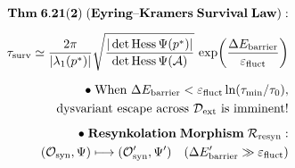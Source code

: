 \documentclass[preview]{standalone}
\begin{document}
\begin{align*}
\special{dvisvgm:raw <g id='unique000'>}\mathbf{Thm\;6.21(2)\;(Eyring\text{--}Kramers\;Survival\;Law):}\\[5pt]\tau_{\text{surv}} \simeq \frac{2\pi}{|\lambda_1(p^*)|}\sqrt{\frac{|\det\operatorname{Hess}\Psi(p^*)|}{\det\operatorname{Hess}\Psi(\mathcal{A})}}\,\exp\!\left(\frac{\Delta E_{\text{barrier}}}{\varepsilon_{\text{fluct}}}\right)\\[6pt]\bullet\;\text{When }\Delta E_{\text{barrier}} < \varepsilon_{\text{fluct}}\ln(\tau_{\min}/\tau_0),\\\;\;\text{dysvariant escape across }\mathcal{D}_{\text{ext}}\text{ is imminent!}\\[5pt]\bullet\;\mathbf{Resynkolation\;Morphism\;\mathcal{R}_{\text{resyn}}:}\\\;\;(\mathcal{O}_{\text{syn}}, \Psi) \longmapsto (\mathcal{O}'_{\text{syn}}, \Psi')\quad(\Delta E'_{\text{barrier}} \gg \varepsilon_{\text{fluct}})\special{dvisvgm:raw </g>}
\end{align*}
\end{document}
